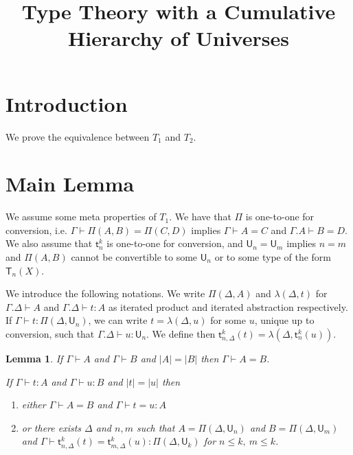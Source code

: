 \documentclass[11pt,a4paper]{article}
\newtheorem{lemma}{Lemma}[theorem]
\theoremstyle{definition}
\def\UU{\mathsf{U}}
\newcommand{\T}{\mathsf{T}}
\newcommand{\sT}{\mathsf{t}}
\begin{document}
\title{Type Theory with a Cumulative Hierarchy of Universes}

\author{}
\date{}
\maketitle


\section{Introduction}\label{sec:intros}

 We prove the equivalence between $T_1$ and $T_2$.

\section{Main Lemma}

We assume some meta properties of $T_1$. We have that $\Pi$ is one-to-one for conversion, i.e.
$\Gamma\vdash \Pi(A,B) = \Pi(C,D)$ implies $\Gamma\vdash A = C$ and
$\Gamma.A\vdash B = D$. We also assume that $\sT^k_n$ is one-to-one for conversion, and
$\UU_n = \UU_m$ implies $n = m$ and $\Pi(A,B)$ cannot be convertible to some $\UU_n$ or
to some type of the form $\T_n(X)$.

We introduce the following notations. We write $\Pi(\Delta,A)$ and $\lambda(\Delta,t)$
for $\Gamma.\Delta\vdash A$ and $\Gamma.\Delta\vdash t:A$
as iterated product and iterated abstraction respectively. If $\Gamma\vdash t : \Pi(\Delta,\UU_n)$, we can write
$t = \lambda(\Delta,u)$ for some $u$, unique up to conversion, such that
$\Gamma.\Delta\vdash u : \UU_n$. We define then
$\sT^k_{n,\Delta}(t) = \lambda(\Delta,\sT^k_n(u))$.

\begin{lemma}
  If $\Gamma\vdash A$ and $\Gamma\vdash B$ and $|A| = |B|$ then $\Gamma\vdash A = B$.

  If $\Gamma\vdash t:A$ and $\Gamma\vdash u:B$ and $|t| = |u|$ then
  \begin{enumerate}
  \item either $\Gamma\vdash A = B$ and $\Gamma\vdash t = u:A$
  \item or there exists $\Delta$ and $n,m$ such that $A = \Pi(\Delta,\UU_n)$ and
    $B = \Pi(\Delta,\UU_m)$ and
    $\Gamma\vdash \sT^k_{n,\Delta}(t) = \sT^k_{m,\Delta}(u):\Pi(\Delta,\UU_k)$ for
    $n\leqslant k,~m\leqslant k$.
\end{enumerate}
\end{lemma}
\end{document}
